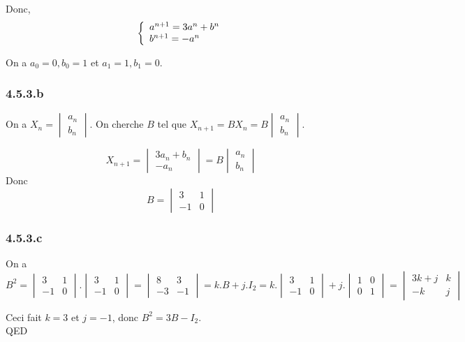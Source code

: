 \documentclass[]{book}
\theoremstyle{definition}
\begin{document}
Donc,
$$
\left\{ 
\begin{array}{l l}
a^{n+1} = 3a^{n} + b^{n}\\
b^{n+1} = -a^{n} \\
\end{array}
\right. 
$$
 
On a $a_0=0, b_0=1$ et $a_1=1, b_1=0$.

\subsubsection*{4.5.3.b}
On a $X_n = \begin{vmatrix} a_n \\ b_n \end{vmatrix}$. On cherche $B$ tel que $X_{n+1} = B X_n = B\begin{vmatrix} a_{n} \\ b_{n} \end{vmatrix}$.

$$X_{n+1} = \begin{vmatrix} 3a_n + b_n\\ -a_{n} \end{vmatrix} = B\begin{vmatrix} a_{n} \\ b_{n} \end{vmatrix}$$
Donc
$$B = \begin{vmatrix} 3 & 1 \\ -1 & 0 \end{vmatrix}$$


\subsubsection*{4.5.3.c}

On a 
$$B^2 = \begin{vmatrix} 3 & 1 \\ -1 & 0 \end{vmatrix} . \begin{vmatrix} 3 & 1 \\ -1 & 0 \end{vmatrix} =
\begin{vmatrix} 8 & 3 \\ -3 & -1 \end{vmatrix} = k.B + j.I_2 =
k . \begin{vmatrix} 3 & 1 \\ -1 & 0 \end{vmatrix} + j .\begin{vmatrix} 1 & 0 \\ 0 & 1 \end{vmatrix} = 
\begin{vmatrix} 3k+j & k \\ -k & j \end{vmatrix} 
$$


Ceci fait $k=3$ et $j=-1$, donc $B^2 = 3B - I_2$.\\

QED
\end{document}
